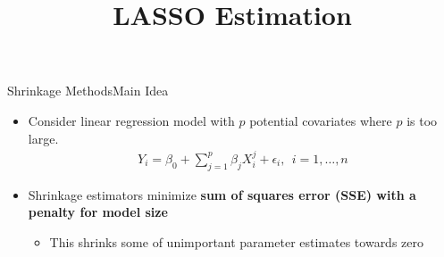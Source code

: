 \documentclass[hyperref={pdfpagelabels=false}]{beamer}
\begin{document}
	
	



\title[]  
{LASSO Estimation}


\author 
{}

\institute{}






\date
{}


\begin{frame}{}
	\titlepage
\end{frame}




	
	
	\begin{frame}{Shrinkage Methods}{Main Idea}
		\begin{itemize}
			\item Consider linear regression model with $p$ potential covariates where $p$ is too large.
			\vspace{0.2cm}
			\begin{eqnarray*}
				Y_{i} = \beta_{0} + \sum^{p}_{j=1} \beta_{j} X^{j}_{i}  + \epsilon_{i}, 
				 \ \ i=1, \ldots ,n
			\end{eqnarray*}		
			\vspace{0.2cm}
			\item Shrinkage estimators minimize \textbf{sum of squares error (SSE) with a penalty for model size} 
			\vspace{0.2cm} 
			\begin{itemize}
				\item This shrinks some of unimportant parameter estimates towards zero 
			\end{itemize}
			\vspace{0.2cm} 
			
		\end{itemize}
	\end{frame}
	
\end{document}
